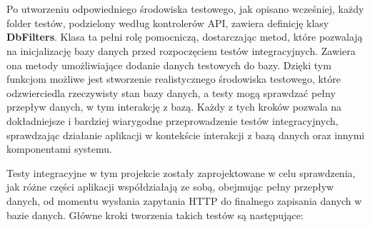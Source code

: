 \documentclass[12pt,a4paper]{article}
\begin{document}
\\\\
Po utworzeniu odpowiedniego środowiska testowego, jak opisano wcześniej, każdy folder testów, podzielony według kontrolerów API, zawiera definicję klasy \textbf{DbFilters}. Klasa ta pełni rolę pomocniczą, dostarczając metod, które pozwalają na inicjalizację bazy danych przed rozpoczęciem testów integracyjnych. Zawiera ona metody umożliwiające dodanie danych testowych do bazy. Dzięki tym funkcjom możliwe jest stworzenie realistycznego środowiska testowego, które odzwierciedla rzeczywisty stan bazy danych, a testy mogą sprawdzać pełny przepływ danych, w tym interakcję z bazą. Każdy z tych kroków pozwala na dokładniejsze i bardziej wiarygodne przeprowadzenie testów integracyjnych, sprawdzając działanie aplikacji w kontekście interakcji z bazą danych oraz innymi komponentami systemu.

\newpage

\noindent
Testy integracyjne w tym projekcie zostały zaprojektowane w celu sprawdzenia, jak różne części aplikacji współdziałają ze sobą, obejmując pełny przepływ danych, od momentu wysłania zapytania HTTP do finalnego zapisania danych w bazie danych. Główne kroki tworzenia takich testów są następujące:
\end{document}
